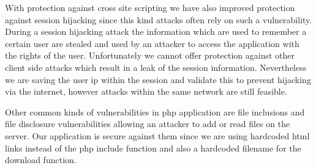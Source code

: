 \noindent
With protection against cross site scripting we have also improved protection against session hijacking since this kind attacks often rely on such a vulnerability. During a session hijacking attack the information which are used to remember a certain user are stealed and used by an attacker to access the application with the rights of the user. Unfortunately we cannot offer protection against other client side attacks which result in a leak of the session information. Nevertheless we are saving the user ip within the session and validate this to prevent hijacking via the internet, however attacks within the same network are still feasible.
\newline

\noindent
Other common kinds of vulnerabilities in php application are file inclusions and file disclosure vulnerabilities allowing an attacker to add or read files on the server. Our application is secure against them since we are using hardcoded html links instead of the php include function and also a hardcoded filename for the download function.










